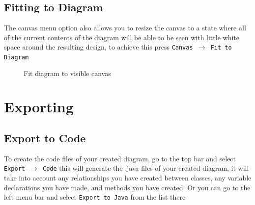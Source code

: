 \documentclass[a4paper]{article}
\begin{document}
\subsection{Fitting to Diagram} 
The canvas menu option also allows you to resize the canvas to a state where all of the current contents of the diagram will be able to be seen with little white space around the resulting design, to achieve this press \texttt{Canvas $\rightarrow$ Fit to Diagram}
\begin{figure}[H] \begin{center}

\label{fig:fitDiagram}
\caption{Fit diagram to visible canvas}
\vspace{-20pt}
\end{center} \end{figure} 
\newpage
\section{Exporting}
\subsection{Export to Code} 
To create the code files of your created diagram, go to the top bar and select \texttt{Export $\rightarrow$ Code} this will generate the .java files of your created diagram, it will take into account any relationships you have created between classes, any variable declarations you have made, and methods you have created. Or you can go to the left menu bar and select \texttt{Export to Java} from the list there
\end{document}
